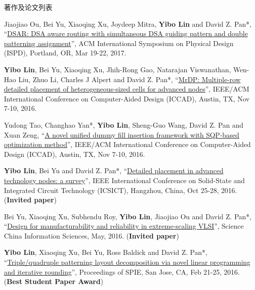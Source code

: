\begin{rSection}{著作及论文列表}
\begin{description}[font=\normalfont, rightmargin=2em]
{}
            

\item[{[C11]}]{
        Jiaojiao Ou, Bei Yu, Xiaoqing Xu, Joydeep Mitra, \textbf{Yibo Lin} and David Z. Pan*, 
    ``\href{https://doi.org/10.1145/3036669.3036677}{DSAR: DSA aware routing with simultaneous DSA guiding pattern and double patterning assignment}'', 
    ACM International Symposium on Physical Design (ISPD), Portland, OR, Mar 19-22, 2017.
    
}
            

\item[{[C10]}]{
        \textbf{Yibo Lin}, Bei Yu, Xiaoqing Xu, Jhih-Rong Gao, Natarajan Viswanathan, Wen-Hao Liu, Zhuo Li, Charles J Alpert and David Z. Pan*, 
    ``\href{http://dx.doi.org/10.1145/2966986.2967055}{MrDP: Multiple-row detailed placement of heterogeneous-sized cells for advanced nodes}'', 
    IEEE/ACM International Conference on Computer-Aided Design (ICCAD), Austin, TX, Nov 7-10, 2016.
    
}
            

\item[{[C9]}]{
        Yudong Tao, Changhao Yan*, \textbf{Yibo Lin}, Sheng-Guo Wang, David Z. Pan and Xuan Zeng, 
    ``\href{http://dx.doi.org/10.1145/2966986.2966994}{A novel unified dummy fill insertion framework with SQP-based optimization method}'', 
    IEEE/ACM International Conference on Computer-Aided Design (ICCAD), Austin, TX, Nov 7-10, 2016.
    
}
            

\item[{[C8]}]{
        \textbf{Yibo Lin}, Bei Yu and David Z. Pan*, 
    ``\href{https://doi.org/10.1109/ICSICT.2016.7999056}{Detailed placement in advanced technology nodes: a survey}'', 
    IEEE International Conference on Solid-State and Integrated Circuit Technology (ICSICT), Hangzhou, China, Oct 25-28, 2016.
    (\textbf{Invited paper})
}
            

\item[{[J7]}]{
        Bei Yu, Xiaoqing Xu, Subhendu Roy, \textbf{Yibo Lin}, Jiaojiao Ou and David Z. Pan*, 
    ``\href{http://link.springer.com/article/10.1007%2Fs11432-016-5560-6}{Design for manufacturability and reliability in extreme-scaling {VLSI}}'', 
    Science China Information Sciences, May, 2016.
    (\textbf{Invited paper})
}
            

\item[{[C6]}]{
        \textbf{Yibo Lin}, Xiaoqing Xu, Bei Yu, Ross Baldick and David Z. Pan*, 
    ``\href{http://dx.doi.org/10.1117/12.2218628}{Triple/quadruple patterning layout decomposition via novel linear programming and iterative rounding}'', 
    Proceedings of SPIE, San Jose, CA, Feb 21-25, 2016.
    (\textbf{Best Student Paper Award})
}
            


\end{description}
\end{rSection}
